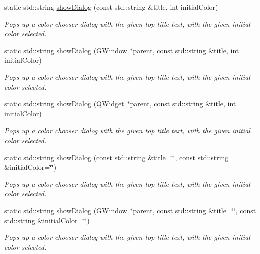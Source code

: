 \begin{DoxyCompactItemize}
\item 
static std\+::string \mbox{\hyperlink{classGColorChooser_a606489cbaca9144ee0a8e22d7646182a}{show\+Dialog}} (const std\+::string \&title, int initial\+Color)
\begin{DoxyCompactList}\small\item\em Pops up a color chooser dialog with the given top title text, with the given initial color selected. \end{DoxyCompactList}\item 
static std\+::string \mbox{\hyperlink{classGColorChooser_a2c513cab2b8e569b35327f89117b077f}{show\+Dialog}} (\mbox{\hyperlink{classGWindow}{G\+Window}} $\ast$parent, const std\+::string \&title, int initial\+Color)
\begin{DoxyCompactList}\small\item\em Pops up a color chooser dialog with the given top title text, with the given initial color selected. \end{DoxyCompactList}\item 
static std\+::string \mbox{\hyperlink{classGColorChooser_a8bac6bfe2b583f676c2ede745053fff6}{show\+Dialog}} (Q\+Widget $\ast$parent, const std\+::string \&title, int initial\+Color)
\begin{DoxyCompactList}\small\item\em Pops up a color chooser dialog with the given top title text, with the given initial color selected. \end{DoxyCompactList}\item 
static std\+::string \mbox{\hyperlink{classGColorChooser_ab649c9d45542c25fa22096c5afa831e7}{show\+Dialog}} (const std\+::string \&title=\char`\"{}\char`\"{}, const std\+::string \&initial\+Color=\char`\"{}\char`\"{})
\begin{DoxyCompactList}\small\item\em Pops up a color chooser dialog with the given top title text, with the given initial color selected. \end{DoxyCompactList}\item 
static std\+::string \mbox{\hyperlink{classGColorChooser_a38b9e47e162e84e985c38c7a8ab69278}{show\+Dialog}} (\mbox{\hyperlink{classGWindow}{G\+Window}} $\ast$parent, const std\+::string \&title=\char`\"{}\char`\"{}, const std\+::string \&initial\+Color=\char`\"{}\char`\"{})
\begin{DoxyCompactList}\small\item\em Pops up a color chooser dialog with the given top title text, with the given initial color selected. \end{DoxyCompactList}\item 

\end{DoxyCompactItemize}
